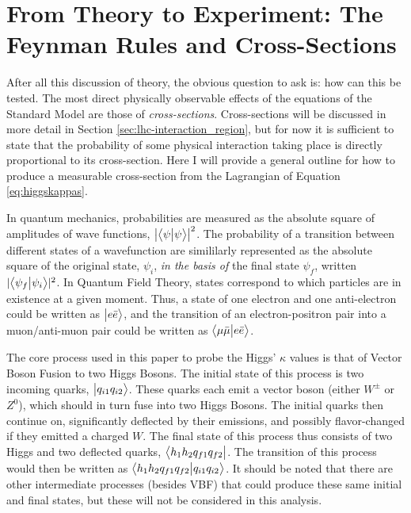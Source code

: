 \section{From Theory to Experiment: The Feynman Rules and Cross-Sections}
    
    After all this discussion of theory, the obvious question to ask is: how can this be tested.
    The most direct physically observable effects of the equations of the Standard Model are those of \textit{cross-sections}.
    Cross-sections will be discussed in more detail in Section \ref{sec:lhc-interaction_region},
        but for now it is sufficient to state that the probability of some physical interaction taking place is directly proportional to its cross-section.
    Here I will provide a general outline for how to produce a measurable cross-section from the Lagrangian of Equation \ref{eq:higgskappas}.

    In quantum mechanics, probabilities are measured as the absolute square of amplitudes of wave functions, $\left|\big< \psi \big| \psi \big>\right|^2$.
    The probability of a transition between different states of a wavefunction are simililarly represented
        as the absolute square of the original state, $\psi_i$, \textit{in the basis of} the final state $\psi_f$,
        written $ |\big< \psi_f \big| \psi_i \big>|^2$.
    In Quantum Field Theory, states correspond to which particles are in existence at a given moment.
    Thus, a state of one electron and one anti-electron could be written as $\big| e \bar{e} \big>$,
        and the transition of an electron-positron pair into a muon/anti-muon pair could be written
        as $\big< \mu \bar{\mu} \big| e \bar{e} \big>$.

    The core process used in this paper to probe the Higgs' $\kappa$ values is that of Vector Boson Fusion to two Higgs Bosons.
    The initial state of this process is two incoming quarks, $\big| q_{i1} q_{i2} \big>$.
    These quarks each emit a vector boson (either $W^{\pm}$ or $Z^0$), 
    which should in turn fuse into two Higgs Bosons.
    The initial quarks then continue on, significantly deflected by their emissions, and possibly flavor-changed if they emitted a charged $W$.
    The final state of this process thus consists of two Higgs and two deflected quarks, $\big< h_1 h_2 q_{f1} q_{f2} \big|$.
    The transition of this process would then be written as $\big<  h_1 h_2 q_{f1} q_{f2} \big| q_{i1} q_{i2} \big>$.
    It should be noted that there are other intermediate processes (besides VBF)
        that could produce these same initial and final states, but these will not be considered in this analysis.


